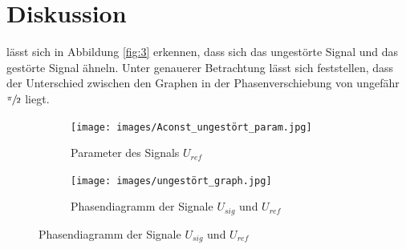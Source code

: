 \section{Diskussion} \label{sec:6}

\justifying lässt sich in Abbildung \ref{fig:3} erkennen, dass sich das ungestörte Signal und das gestörte Signal ähneln. Unter 
genauerer Betrachtung lässt sich feststellen, dass der Unterschied zwischen den Graphen in der Phasenverschiebung von ungefähr $\sfrac{\pi}{2}$
liegt. 

\begin{figure}[H] 
\caption{Funktionalität des Gleichrichters}
\label{fig:7}
    \begin{subfigure}{0.495\linewidth}
        \centering
        \texttt{[image: images/Aconst\_ungestört\_param.jpg]}
        \caption{Parameter des Signals $U_{ref}$}
        \label{fig:7a}
    \end{subfigure}
    \begin{subfigure}{0.495\linewidth}
        \centering
        \texttt{[image: images/ungestört\_graph.jpg]}
        \caption{Phasendiagramm der Signale $U_{sig}$ und $U_{ref}$}
        \label{fig:7b}
    \end{subfigure}
\end{figure}


\newpage
\printbibliography

